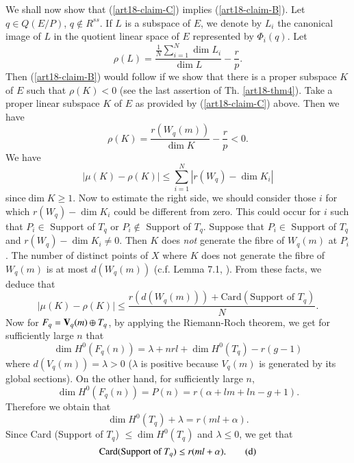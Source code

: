 We shall now show that (\ref{art18-claim-C}) implies (\ref{art18-claim-B}). Let $q\in Q(E/P)$, $q\not\in R^{ss}$. If $L$ is a subspace of $E$, we denote by $L_{i}$ the canonical image of $L$ in the quotient linear space of $E$ represented by $\Phi_{i}(q)$. Let
$$
\rho(L)=\dfrac{\frac{1}{N}\sum\limits^{N}_{i=1}\dim L_{i}}{\dim L}-\dfrac{r}{p}.
$$
Then (\ref{art18-claim-B}) would follow if we show that there is a proper subspace $K$ of $E$ such that $\rho(K)<0$ (see the last assertion of Th. \ref{art18-thm4}). Take a proper linear subspace $K$ of $E$ as provided by (\ref{art18-claim-C}) above. Then we have
$$
\rho(K)=\dfrac{r(W_{q}(m))}{\dim K}-\dfrac{r}{p}<0.
$$
We have
\begin{equation*}
|\mu (K)-\rho(K)|\leq \sum\limits^{N}_{i=1}|r(W_{q})-\dim K_{i}|\tag{a}\label{art18-eq-a}
\end{equation*}
since\pageoriginale $\dim K\geq 1$. Now to estimate the right side, we should consider those $i$ for which $r(W_{q})-\dim K_{i}$ could be different from zero. This could occur for $i$ such that $P_{i}\in $ Support of $T_{q}$ or $P_{i}\not\in $ Support of $T_{q}$. Suppose that $P_{i}\in$ Support of $T_{q}$ and $r(W_{q})-\dim K_{i}\neq 0$. Then $K$ does {\em not} generate the fibre of $W_{q}(m)$ at $P_{i}$. The number of distinct points of $X$ where $K$ does not generate the fibre of $W_{q}(m)$ is at most $d(W_{q}(m))$ (c.f. Lemma 7.1, \cite{art18-key12}). From these facts, we deduce that
\begin{equation*}
|\mu(K)-\rho(K)|\leq \dfrac{r(d(W_{q}(m)))+\text{Card} (\text{Support of } T_{q})}{N}.\tag{b}\label{art18-eq-b}
\end{equation*}
Now for $F_{q}=\mathbf{V}_{q}(m)\oplus T_{q}$, by applying the Riemann-Roch theorem, we get for sufficiently large $n$ that
$$
\dim H^{0}(F_{q}(n))=\lambda+nrl+\dim H^{0}(T_{q})-r(g-1)
$$
where $d(V_{q}(m))=\lambda > 0$ ($\lambda$ is positive because $V_{q}(m)$ is generated by its global sections). On the other hand, for sufficiently large $n$,
$$
\dim H^{0}(F_{q}(n))=P(n)=r(\alpha+lm+ln-g+1).
$$
Therefore we obtain that
\begin{equation*}
\dim H^{0}(T_{q})+\lambda=r(ml+\alpha).\tag{c}\label{art18-eq-c}
\end{equation*}
Since Card (Support of $T_{q}$) $\leq \dim H^{0}(T_{q})$ and $\lambda\leq 0$, we get that
\begin{equation*}
\operatorname{\mathrm{Card}} (\text{Support of } T_{q})\leq r(ml+\alpha).\tag{d}\label{art18-eq-d}
\end{equation*}

